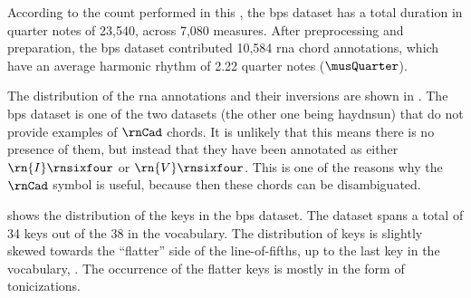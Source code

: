 
According to the count performed in this \thesisdiss{}, the
\gls{bps} dataset has a total duration in quarter notes of
23,540, across 7,080 measures. After preprocessing and
preparation, the \gls{bps} dataset contributed 10,584
\gls{rna} chord annotations, which have an average harmonic
rhythm of 2.22 quarter notes ($\musQuarter$).

The distribution of the \gls{rna} annotations and their
inversions are shown in . The
\gls{bps} dataset is one of the two datasets (the other one
being \gls{haydnsun}) that do not provide examples of
$\rnCad$ chords. It is unlikely that this means there is no
presence of them, but instead that they have been annotated
as either $\rn{I}\rnsixfour$ or $\rn{V}\rnsixfour$. This is
one of the reasons why the $\rnCad$ symbol is useful,
because then these chords can be disambiguated.



 shows the distribution of the keys
in the \gls{bps} dataset. The dataset spans a total of 34
keys out of the 38 in the vocabulary. The distribution of
keys is slightly skewed towards the ``flatter'' side of the
line-of-fifths, up to the last key in the vocabulary,
\keyBbb{}. The occurrence of the flatter keys is mostly in
the form of tonicizations. 
